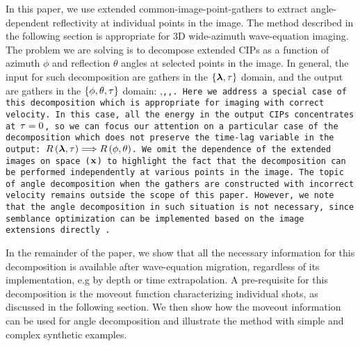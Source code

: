 In this paper, we use extended common-image-point-gathers to extract angle-dependent reflectivity at individual points in the image. The method described in the following section is appropriate for 3D wide-azimuth wave-equation imaging. The problem we are solving is to decompose extended CIPs as a function of azimuth $\phi$ and reflection $\theta$ angles at selected points in the image. In general, the input for such decomposition are gathers in the $\{\hh,\tt\}$ domain, and the output are gathers in the $\{\phi,\theta,\tt\}$ domain:
%
\beq
\RR\lp \hh,\tt \rp \Longrightarrow \RR\lp \phi,\theta,\tt \rp \;.
\eeq
%
Here we address a special case of this decomposition which is appropriate for imaging with correct velocity. In this case, all the energy in the output CIPs concentrates at $\tt=0$, so we can focus our attention on a particular case of the decomposition which does not preserve the time-lag variable in the output: $\RR\lp \hh,\tt \rp \Longrightarrow \RR\lp \phi,\theta \rp$. We omit the dependence of the extended images on space ($\xx$) to highlight the fact that the decomposition can be performed independently at various points in the image.
The topic of angle decomposition when the gathers are constructed with incorrect velocity remains outside the scope of this paper. However, we note that the angle decomposition in such situation is not necessary, since semblance optimization can be implemented based on the image extensions directly \cite[]{ShenSymes.geo.2008,Symes.gpr2009.velocity}.  

In the remainder of the paper, we show that all the necessary information for this decomposition is available after wave-equation migration, regardless of its implementation, e.g by depth or time extrapolation. A pre-requisite for this decomposition is the moveout function characterizing individual shots, as discussed in the following section. We then show how the moveout information can be used for angle decomposition and illustrate the method with simple and complex synthetic examples.

